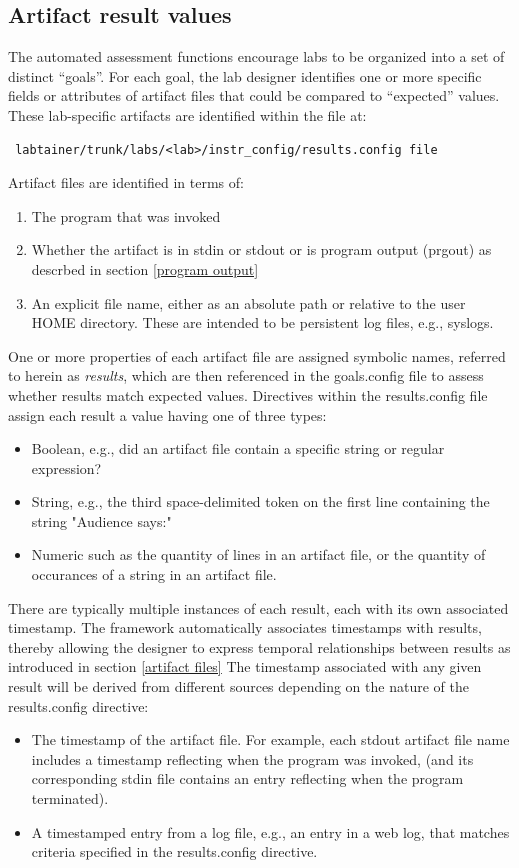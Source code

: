 \documentclass[12pt]{article}
\begin{document}
\subsection{Artifact result values}
\label{results.config}
The automated assessment functions encourage labs to be organized into a set of distinct ``goals''.
For each goal, the lab designer identifies one or more specific fields or attributes of artifact files that
could be compared to ``expected'' values.  These lab-specific artifacts are identified within the
file at:
\begin{verbatim}
 labtainer/trunk/labs/<lab>/instr_config/results.config file
\end{verbatim}
\noindent Artifact files are identified in terms of:
\begin{enumerate}
\item The program that was invoked
\item Whether the artifact is in stdin or stdout or is program output (prgout) as descrbed in section \ref{program output}
\item An explicit file name, either as an absolute path or relative to the user HOME directory.  These are intended
to be persistent log files, e.g., syslogs.
\end{enumerate}

One or more properties of each artifact file are assigned symbolic names, referred to herein as \textit{results}, which 
are then referenced in the goals.config file to assess whether results match expected values.  Directives within the
results.config file assign each result a value having one of three types:
\begin{itemize}
\item Boolean, e.g., did an artifact file contain a specific string or regular expression?
\item String, e.g., the third space-delimited token on the first line containing the string "Audience says:"
\item Numeric such as the quantity of lines in an artifact file, or the quantity of occurances of a string in an artifact file.
\end{itemize} 

There are typically multiple instances of each result, each with its own associated timestamp. The framework automatically
associates timestamps with results, thereby allowing the designer to express temporal relationships between results
as introduced in section \ref{artifact files} The timestamp associated with any given result will be derived from different
sources depending on the nature of the results.config directive:
\begin{itemize}
\item The timestamp of the artifact file.  For example, each stdout artifact file name includes a timestamp reflecting when the
program was invoked, (and its corresponding stdin file contains an entry reflecting when the program terminated).
\item A timestamped entry from a log file, e.g., an entry in a web log, that matches criteria specified in the results.config
directive.
\end{itemize}
\end{document}
